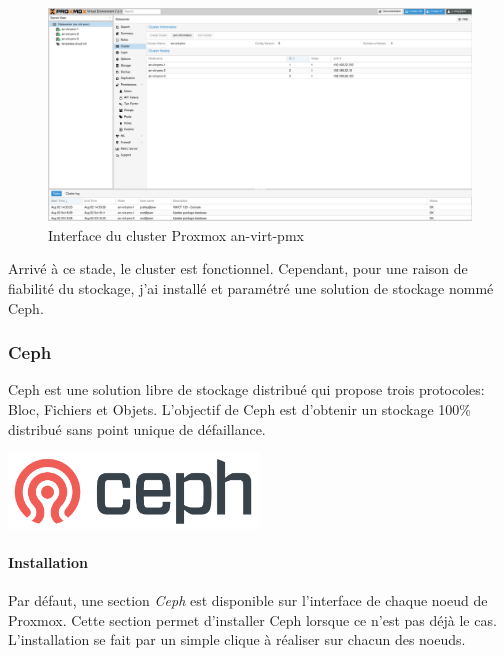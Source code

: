 \documentclass[12pt]{article}
\begin{document}
\begin{figure}
    \centering
        \includegraphics[width=\textwidth]{src/proxmox_interface.png}
    \caption{Interface du cluster Proxmox an-virt-pmx}
    \label{fig:proxmox_virt1}
\end{figure}

Arrivé à ce stade, le cluster est fonctionnel. 
Cependant, pour une raison de fiabilité du stockage, j'ai installé et paramétré une solution de stockage nommé Ceph.

\subsubsection{Ceph}
\noindent%
\begin{minipage}{.7\textwidth}%
Ceph est une solution libre de stockage distribué qui propose trois protocoles: Bloc, Fichiers et Objets.
L'objectif de Ceph est d'obtenir un stockage 100\% distribué sans point unique de défaillance.

\end{minipage}%
\hfill
\begin{minipage}{.3\textwidth}%
\begin{center}
\includegraphics[width=0.5\textwidth]{src/ceph.png}
\end{center}
\end{minipage}%

\paragraph{Installation}
Par défaut, une section \textit{Ceph} est disponible sur l'interface de chaque noeud de Proxmox. 
Cette section permet d'installer Ceph lorsque ce n'est pas déjà le cas.
L'installation se fait par un simple clique à réaliser sur chacun des noeuds.
\end{document}
